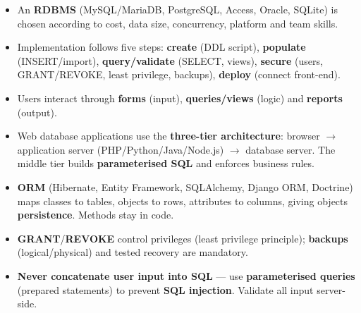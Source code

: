 \documentclass[11pt]{article}
\begin{document}
\begin{aretenir}
\begin{itemize}
\item An \textbf{RDBMS} (MySQL/MariaDB, PostgreSQL, Access, Oracle, SQLite) is chosen according to cost, data size, concurrency, platform and team skills.
\item Implementation follows five steps: \textbf{create} (DDL script), \textbf{populate} (INSERT/import), \textbf{query/validate} (SELECT, views), \textbf{secure} (users, GRANT/REVOKE, least privilege, backups), \textbf{deploy} (connect front-end).
\item Users interact through \textbf{forms} (input), \textbf{queries/views} (logic) and \textbf{reports} (output).
\item Web database applications use the \textbf{three-tier architecture}: browser $\rightarrow$ application server (PHP/Python/Java/Node.js) $\rightarrow$ database server. The middle tier builds \textbf{parameterised SQL} and enforces business rules.
\item \textbf{ORM} (Hibernate, Entity Framework, SQLAlchemy, Django ORM, Doctrine) maps classes to tables, objects to rows, attributes to columns, giving objects \textbf{persistence}. Methods stay in code.
\item \textbf{GRANT}/\textbf{REVOKE} control privileges (least privilege principle); \textbf{backups} (logical/physical) and tested recovery are mandatory.
\item \textbf{Never concatenate user input into SQL} — use \textbf{parameterised queries} (prepared statements) to prevent \textbf{SQL injection}. Validate all input server-side.
\end{itemize}
\end{aretenir}
\end{document}
